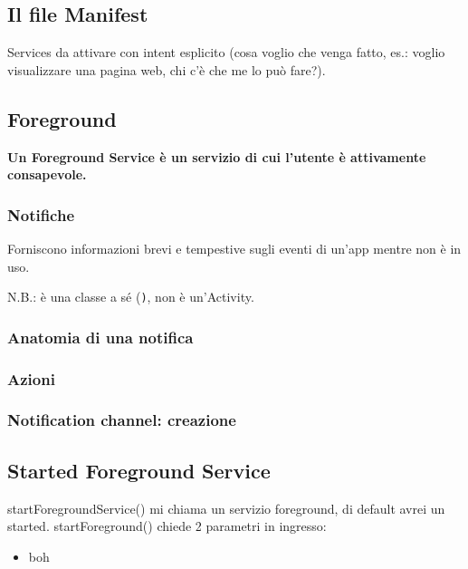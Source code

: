 \subsection{Il file Manifest}
\par Services da attivare con intent esplicito (cosa voglio che venga fatto, es.: voglio visualizzare una pagina web, chi c'è che me lo può fare?).

\subsection{Foreground}
\par \textbf{Un Foreground Service è un servizio di cui l'utente è attivamente consapevole.}

\subsubsection{Notifiche}
\par Forniscono informazioni brevi e tempestive sugli eventi di un'app mentre non è in uso.
\par N.B.: è una classe a sé (\texttt), non è un'Activity.

\subsubsection{Anatomia di una notifica}

\subsubsection{Azioni}

\subsubsection{Notification channel: creazione}

\subsection{Started Foreground Service}
startForegroundService() mi chiama un servizio foreground, di default avrei un started.
startForeground() chiede 2 parametri in ingresso:
\begin{itemize}
    \item boh
\end{itemize}



